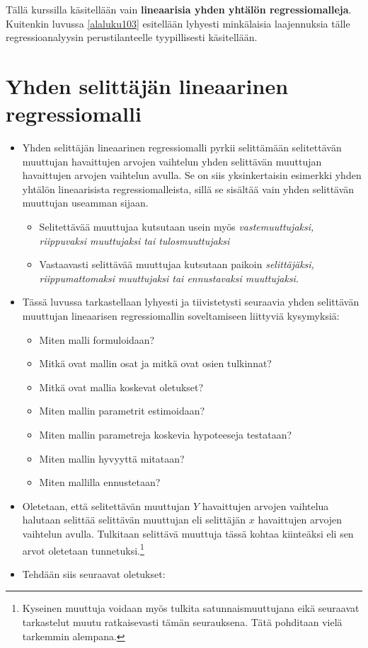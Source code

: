 \documentclass[
]{book}
\providecommand{\tightlist}{%
  \setlength{\itemsep}{0pt}\setlength{\parskip}{0pt}}
\begin{document}
Tällä kurssilla käsitellään vain \textbf{lineaarisia yhden yhtälön regressiomalleja}. Kuitenkin luvussa \ref{alaluku103} esitellään lyhyesti minkälaisia laajennuksia tälle regressioanalyysin perustilanteelle tyypillisesti käsitellään.

\hypertarget{alaluku102}{%
\section{Yhden selittäjän lineaarinen regressiomalli}\label{alaluku102}}

\begin{itemize}
\item
  Yhden selittäjän lineaarinen regressiomalli pyrkii selittämään selitettävän muuttujan havaittujen arvojen vaihtelun yhden selittävän muuttujan havaittujen arvojen vaihtelun avulla. Se on siis yksinkertaisin esimerkki yhden yhtälön lineaarisista regressiomalleista, sillä se sisältää vain yhden selittävän muuttujan useamman sijaan.

  \begin{itemize}
  \tightlist
  \item
    Selitettävää muuttujaa kutsutaan usein myös \emph{vastemuuttujaksi, riippuvaksi muuttujaksi tai tulosmuuttujaksi}
  \item
    Vastaavasti selittävää muuttujaa kutsutaan paikoin \emph{selittäjäksi, riippumattomaksi muuttujaksi tai ennustavaksi muuttujaksi}.
  \end{itemize}
\item
  Tässä luvussa tarkastellaan lyhyesti ja tiivistetysti seuraavia yhden selittävän muuttujan lineaarisen regressiomallin soveltamiseen liittyviä kysymyksiä:

  \begin{itemize}
  \tightlist
  \item
    Miten malli formuloidaan?
  \item
    Mitkä ovat mallin osat ja mitkä ovat osien tulkinnat?
  \item
    Mitkä ovat mallia koskevat oletukset?
  \item
    Miten mallin parametrit estimoidaan?
  \item
    Miten mallin parametreja koskevia hypoteeseja testataan?
  \item
    Miten mallin hyvyyttä mitataan?
  \item
    Miten mallilla ennustetaan?
  \end{itemize}
\item
  Oletetaan, että selitettävän muuttujan \(Y\) havaittujen arvojen vaihtelua halutaan selittää selittävän muuttujan eli selittäjän \(x\) havaittujen arvojen vaihtelun avulla. Tulkitaan selittävä muuttuja tässä kohtaa kiinteäksi eli sen arvot oletetaan tunnetuksi.\footnote{Kyseinen muuttuja voidaan myös tulkita satunnaismuuttujana eikä seuraavat tarkastelut muutu ratkaisevasti tämän seurauksena. Tätä pohditaan vielä tarkemmin alempana.}
\item
  Tehdään siis seuraavat oletukset:


\end{itemize}
\end{document}
